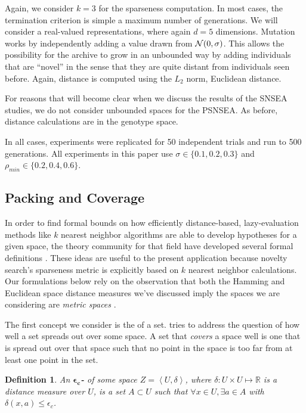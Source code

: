 \documentclass[twoside]{article}
\newtheorem{definition}{Definition}
\newcommand{\IR}{\mathbb{R}}
\begin{document}
Again, we consider $k=3$ for the sparseness computation.  In most cases, the termination criterion is simple a maximum number of generations.  We will consider a real-valued representations, where again $d=5$ dimensions.  Mutation works by independently adding a value drawn from ${\cal N}(0,\sigma)$.  This allows the possibility for the archive to grow in an unbounded way by adding individuals that are ``novel'' in the sense that they are quite distant from individuals seen before.  Again, distance is computed using the $L_2$ norm, Euclidean distance.

For reasons that will become clear when we discuss the results of the SNSEA studies, we do not consider unbounded spaces for the PSNSEA.  As before, distance calculations are in the genotype space.

In all cases, experiments were replicated for 50 independent trials and run to 500 generations. All experiments in this paper use $\sigma\in\{0.1,0.2,0.3\}$ and $\rho_{min} \in \{0.2,0.4,0.6\}$. 


\subsection{Packing and Coverage}
\label{subsec:knn}

In order to find formal bounds on how efficiently distance-based, lazy-evaluation methods like $k$ nearest neighbor algorithms are able to develop hypotheses for a given space, the theory community for that field have developed several formal definitions \citep{Clarkson1999dcg}.  These ideas are useful to the present application because novelty search's sparseness metric is explicitly based on $k$ nearest neighbor calculations.  Our formulations below rely on the observation that both the Hamming and Euclidean space distance measures we've discussed imply the spaces we are considering are \emph{metric spaces} \citep{Bryant1985}.

The first concept we consider is the  of a set.   tries to address the question of how well a set spreads out over some space.  A set that \emph{covers} a space well is one that is spread out over that space such that no point in the space is too far from at least one point in the set.

\begin{definition}
An $\boldsymbol{\epsilon_c}$\textbf{-} of some space $Z=\left\langle U, \delta\right\rangle$, where $\delta: U\times U \mapsto \IR$ is a distance measure over $U$, is a set $A \subset U$ such that $\forall x\in U, \exists a\in A$ with $\delta(x,a) \leq \epsilon_c$. 
\end{definition}
\end{document}
